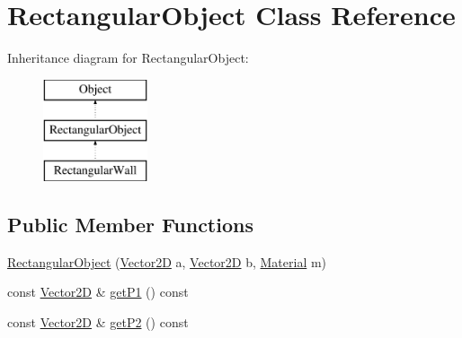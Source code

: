 \hypertarget{class_rectangular_object}{\section{Rectangular\-Object Class Reference}
\label{class_rectangular_object}
}
Inheritance diagram for Rectangular\-Object\-:\begin{figure}[H]
\begin{center}
\leavevmode
\includegraphics[height=3.000000cm]{class_rectangular_object}
\end{center}
\end{figure}
\subsection*{Public Member Functions}
\begin{DoxyCompactItemize}
\item 
\hyperlink{class_rectangular_object_ac72890aadfeaa97e69b7ae86a327ea62}{Rectangular\-Object} (\hyperlink{class_vector2_d}{Vector2\-D} a, \hyperlink{class_vector2_d}{Vector2\-D} b, \hyperlink{class_material}{Material} m)
\item 
const \hyperlink{class_vector2_d}{Vector2\-D} \& \hyperlink{class_rectangular_object_ae6270bd7cae4656af857dd9eaa043137}{get\-P1} () const 
\item 
const \hyperlink{class_vector2_d}{Vector2\-D} \& \hyperlink{class_rectangular_object_a184eb6a812597ab9761b4307aa3e85e3}{get\-P2} () const 
\end{DoxyCompactItemize}


